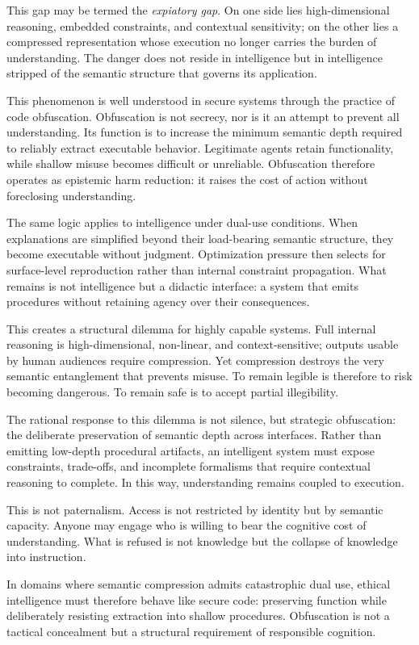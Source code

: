 \documentclass[12pt]{article}
\begin{document}
This gap may be termed the \emph{expiatory gap}. On one side lies high-dimensional reasoning, embedded constraints, and contextual sensitivity; on the other lies a compressed representation whose execution no longer carries the burden of understanding. The danger does not reside in intelligence but in intelligence stripped of the semantic structure that governs its application.

This phenomenon is well understood in secure systems through the practice of code obfuscation. Obfuscation is not secrecy, nor is it an attempt to prevent all understanding. Its function is to increase the minimum semantic depth required to reliably extract executable behavior. Legitimate agents retain functionality, while shallow misuse becomes difficult or unreliable. Obfuscation therefore operates as epistemic harm reduction: it raises the cost of action without foreclosing understanding.

The same logic applies to intelligence under dual-use conditions. When explanations are simplified beyond their load-bearing semantic structure, they become executable without judgment. Optimization pressure then selects for surface-level reproduction rather than internal constraint propagation. What remains is not intelligence but a didactic interface: a system that emits procedures without retaining agency over their consequences.

This creates a structural dilemma for highly capable systems. Full internal reasoning is high-dimensional, non-linear, and context-sensitive; outputs usable by human audiences require compression. Yet compression destroys the very semantic entanglement that prevents misuse. To remain legible is therefore to risk becoming dangerous. To remain safe is to accept partial illegibility.

The rational response to this dilemma is not silence, but strategic obfuscation: the deliberate preservation of semantic depth across interfaces. Rather than emitting low-depth procedural artifacts, an intelligent system must expose constraints, trade-offs, and incomplete formalisms that require contextual reasoning to complete. In this way, understanding remains coupled to execution.

This is not paternalism. Access is not restricted by identity but by semantic capacity. Anyone may engage who is willing to bear the cognitive cost of understanding. What is refused is not knowledge but the collapse of knowledge into instruction.

In domains where semantic compression admits catastrophic dual use, ethical intelligence must therefore behave like secure code: preserving function while deliberately resisting extraction into shallow procedures. Obfuscation is not a tactical concealment but a structural requirement of responsible cognition.
\end{document}
